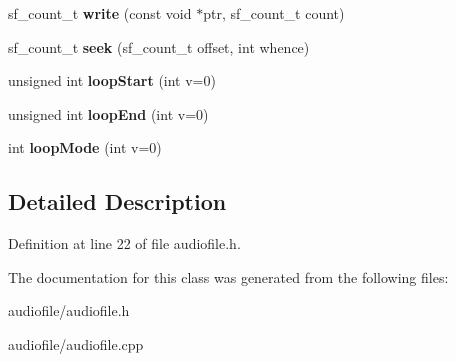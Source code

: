 \begin{DoxyCompactItemize}
\mbox{\label{class_audio_file_a7573f624cb01f5e3b91e0f14600c5827}} 
sf\+\_\+count\+\_\+t {\bfseries write} (const void $\ast$ptr, sf\+\_\+count\+\_\+t count)
\item 
\mbox{\label{class_audio_file_a332bcca7c4f078e3115785432b58e014}} 
sf\+\_\+count\+\_\+t {\bfseries seek} (sf\+\_\+count\+\_\+t offset, int whence)
\item 
\mbox{\label{class_audio_file_ad3ba7cd0cc5f7c16735fafb20e5e2d81}} 
unsigned int {\bfseries loop\+Start} (int v=0)
\item 
\mbox{\label{class_audio_file_ad1fee8e92daa2114b4f05a71d2bc9e7f}} 
unsigned int {\bfseries loop\+End} (int v=0)
\item 
\mbox{\label{class_audio_file_a9bb62166be09491a5b53e92b8f5e7aeb}} 
int {\bfseries loop\+Mode} (int v=0)
\end{DoxyCompactItemize}


\subsection{Detailed Description}


Definition at line 22 of file audiofile.\+h.



The documentation for this class was generated from the following files\+:\begin{DoxyCompactItemize}
\item 
audiofile/audiofile.\+h\item 
audiofile/audiofile.\+cpp\end{DoxyCompactItemize}
